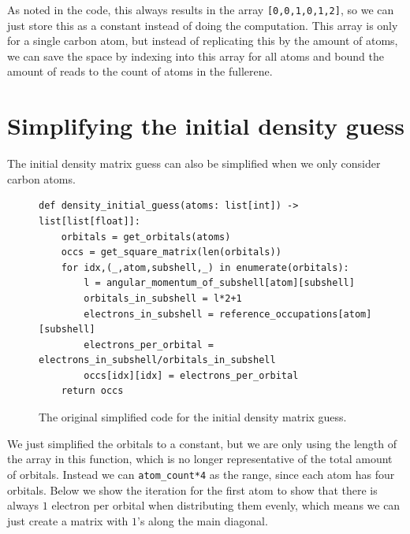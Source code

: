 As noted in the code, this always results in the array \verb|[0,0,1,0,1,2]|, so we can just store this as a constant instead of doing the computation. This array is only for a single carbon atom, but instead of replicating this by the amount of atoms, we can save the space by indexing into this array for all atoms and bound the amount of reads to the count of atoms in the fullerene.

\section{Simplifying the initial density guess}

The initial density matrix guess can also be simplified when we only consider carbon atoms.

\begin{figure}[H]
\begin{verbatim}
def density_initial_guess(atoms: list[int]) -> list[list[float]]:
    orbitals = get_orbitals(atoms)
    occs = get_square_matrix(len(orbitals))
    for idx,(_,atom,subshell,_) in enumerate(orbitals):
        l = angular_momentum_of_subshell[atom][subshell] 
        orbitals_in_subshell = l*2+1 
        electrons_in_subshell = reference_occupations[atom][subshell]
        electrons_per_orbital = electrons_in_subshell/orbitals_in_subshell
        occs[idx][idx] = electrons_per_orbital
    return occs
\end{verbatim}
\caption{The original simplified code for the initial density matrix guess.}
\end{figure}

We just simplified the orbitals to a constant, but we are only using the length of the array in this function, which is no longer representative of the total amount of orbitals. Instead we can \verb|atom_count*4| as the range, since each atom has four orbitals. Below we show the iteration for the first atom to show that there is always $1$ electron per orbital when distributing them evenly, which means we can just create a matrix with $1$'s along the main diagonal.

